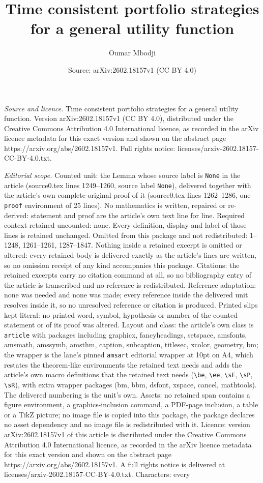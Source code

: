 \documentclass[10pt,a4paper]{amsart}
\title[Time consistent portfolio strategies for a general utility f]{Time consistent portfolio strategies for a general utility function}
\author{Oumar Mbodji}
\date{Source: arXiv:2602.18157v1 (CC BY 4.0)}
\begin{document}
\maketitle

\noindent\emph{Source and licence.} Time consistent portfolio strategies for a general utility function. Version arXiv:2602.18157v1 (CC BY 4.0), distributed under the Creative Commons Attribution 4.0 International licence, as recorded in the arXiv licence metadata for this exact version and shown on the abstract page https://arxiv.org/abs/2602.18157v1. Full rights notice: licenses/arxiv-2602.18157-CC-BY-4.0.txt.\par\smallskip

\noindent\textit{Editorial scope.} Counted unit: the Lemma whose source label is \texttt{None} in the article (source0.tex lines 1249--1260, source label \texttt{None}), delivered together with the article's own complete original proof of it (source0.tex lines 1262--1286, one \texttt{proof} environment of 25 lines). No mathematics is written, repaired or re-derived: statement and proof are the article's own text line for line. Required context retained uncounted: none. Every definition, display and label of those lines is retained unchanged. Omitted from this package and not redistributed: 1--1248, 1261--1261, 1287--1847. Nothing inside a retained excerpt is omitted or altered: every retained body is delivered exactly as the article's lines are written, so no omission receipt of any kind accompanies this package. Citations: the retained excerpts carry no citation command at all, so no bibliography entry of the article is transcribed and no reference is redistributed. Reference adaptation: none was needed and none was made; every reference inside the delivered unit resolves inside it, so no unresolved reference or citation is produced. Printed slips kept literal: no printed word, symbol, hypothesis or number of the counted statement or of its proof was altered. Layout and class: the article's own class is \texttt{article} with packages including graphicx, fancyheadings, setspace, amsfonts, amsmath, amssymb, amsthm, caption, subcaption, titlesec, xcolor, geometry, bm; the wrapper is the lane's pinned \texttt{amsart} editorial wrapper at 10pt on A4, which restates the theorem-like environments the retained text needs and adds the article's own macro definitions that the retained text needs (\texttt{\textbackslash be}, \texttt{\textbackslash ee}, \texttt{\textbackslash sE}, \texttt{\textbackslash sP}, \texttt{\textbackslash sR}), with extra wrapper packages (bm, bbm, dsfont, xspace, cancel, mathtools). The delivered numbering is the unit's own. Assets: no retained span contains a figure environment, a graphics-inclusion command, a PDF-page inclusion, a table or a TikZ picture; no image file is copied into this package, the package declares no asset dependency and no image file is redistributed with it. Licence: version arXiv:2602.18157v1 of this article is distributed under the Creative Commons Attribution 4.0 International licence, as recorded in the arXiv licence metadata for this exact version and shown on the abstract page https://arxiv.org/abs/2602.18157v1. A full rights notice is delivered at licenses/arxiv-2602.18157-CC-BY-4.0.txt. Characters: every 
\end{document}
